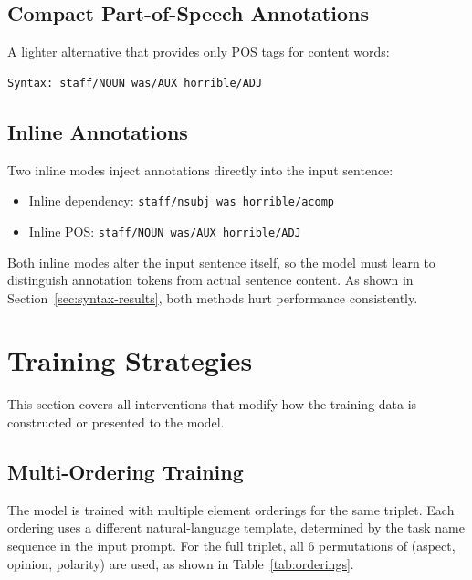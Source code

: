 \documentclass[12pt,a4paper]{report}
\begin{document}
\subsection{Compact Part-of-Speech Annotations}

A lighter alternative that provides only POS tags for content words:

\begin{lstlisting}
Syntax: staff/NOUN was/AUX horrible/ADJ
\end{lstlisting}

\subsection{Inline Annotations}

Two inline modes inject annotations directly into the input sentence:
\begin{itemize}
    \item Inline dependency: \texttt{staff/nsubj was horrible/acomp}
    \item Inline POS: \texttt{staff/NOUN was/AUX horrible/ADJ}
\end{itemize}

Both inline modes alter the input sentence itself, so the model must learn to distinguish annotation tokens from actual sentence content. As shown in Section~\ref{sec:syntax-results}, both methods hurt performance consistently.


\section{Training Strategies}\label{sec:training-strategies}

This section covers all interventions that modify how the training data is constructed or presented to the model.

\subsection{Multi-Ordering Training}

The model is trained with multiple element orderings for the same triplet. Each ordering uses a different natural-language template, determined by the task name sequence in the input prompt. For the full triplet, all 6 permutations of (aspect, opinion, polarity) are used, as shown in Table~\ref{tab:orderings}.
\end{document}
